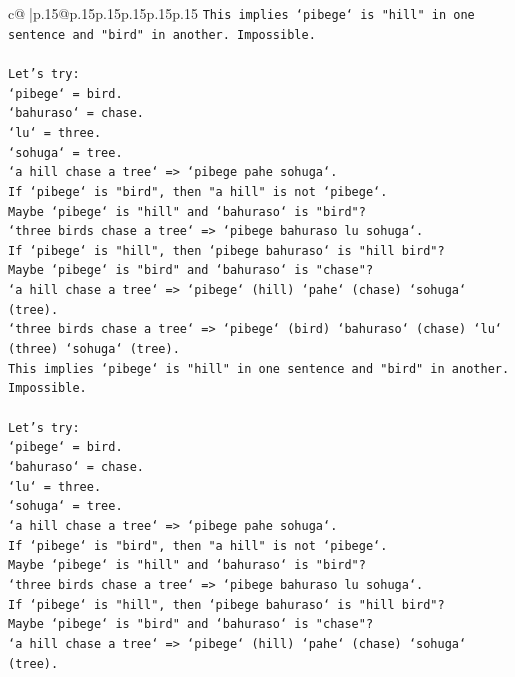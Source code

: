 \documentclass{article}
\begin{document}
{\begin{supertabular}{c@{$\;$}|p{.15\linewidth}@{}p{.15\linewidth}p{.15\linewidth}p{.15\linewidth}p{.15\linewidth}p{.15\linewidth}}
{{{\texttt{This implies `pibege` is "hill" in one sentence and "bird" in another. Impossible.} \\
\\ 
\texttt{Let's try:} \\
\texttt{`pibege` = bird.} \\
\texttt{`bahuraso` = chase.} \\
\texttt{`lu` = three.} \\
\texttt{`sohuga` = tree.} \\
\texttt{`a hill chase a tree` => `pibege pahe sohuga`.} \\
\texttt{If `pibege` is "bird", then "a hill" is not `pibege`.} \\
\texttt{Maybe `pibege` is "hill" and `bahuraso` is "bird"?} \\
\texttt{`three birds chase a tree` => `pibege bahuraso lu sohuga`.} \\
\texttt{If `pibege` is "hill", then `pibege bahuraso` is "hill bird"?} \\
\texttt{Maybe `pibege` is "bird" and `bahuraso` is "chase"?} \\
\texttt{`a hill chase a tree` => `pibege` (hill) `pahe` (chase) `sohuga` (tree).} \\
\texttt{`three birds chase a tree` => `pibege` (bird) `bahuraso` (chase) `lu` (three) `sohuga` (tree).} \\
\texttt{This implies `pibege` is "hill" in one sentence and "bird" in another. Impossible.} \\
\\ 
\texttt{Let's try:} \\
\texttt{`pibege` = bird.} \\
\texttt{`bahuraso` = chase.} \\
\texttt{`lu` = three.} \\
\texttt{`sohuga` = tree.} \\
\texttt{`a hill chase a tree` => `pibege pahe sohuga`.} \\
\texttt{If `pibege` is "bird", then "a hill" is not `pibege`.} \\
\texttt{Maybe `pibege` is "hill" and `bahuraso` is "bird"?} \\
\texttt{`three birds chase a tree` => `pibege bahuraso lu sohuga`.} \\
\texttt{If `pibege` is "hill", then `pibege bahuraso` is "hill bird"?} \\
\texttt{Maybe `pibege` is "bird" and `bahuraso` is "chase"?} \\
\texttt{`a hill chase a tree` => `pibege` (hill) `pahe` (chase) `sohuga` (tree).} \\
}}}
\end{supertabular}}
\end{document}
